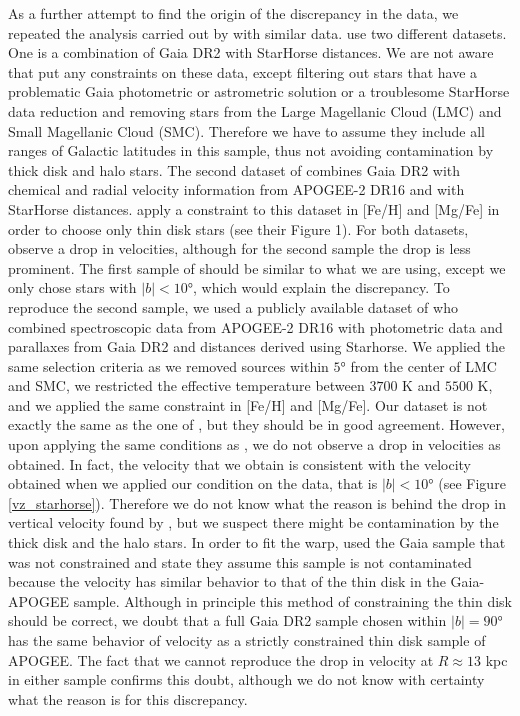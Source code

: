 \documentclass[twocolumn]{aastex63}
\begin{document}
As a further attempt to find the origin of the discrepancy in the data, we repeated the analysis carried out by  with similar data.  use two different datasets. One is a combination of Gaia DR2 with StarHorse distances. We are not aware that  put any constraints on these data, except filtering out stars that have a problematic Gaia photometric or astrometric solution or a troublesome StarHorse data reduction and removing stars from the Large Magellanic Cloud (LMC) and Small Magellanic Cloud (SMC). Therefore we have to assume they include all ranges of Galactic latitudes in this sample, thus not avoiding contamination by thick disk and halo stars. The second dataset of  combines Gaia DR2 with chemical and radial velocity information from APOGEE-2 DR16 and with StarHorse distances.  apply a constraint to this dataset in [Fe/H] and [Mg/Fe] in order to choose only thin disk stars (see their Figure 1). For both datasets,  observe a drop in velocities, although for the second sample the drop is less prominent. The first sample of  should be similar to what we are using, except we only chose stars with $\lvert b \rvert < \ang{10}$, which would explain the discrepancy. To reproduce the second sample, we used a publicly available dataset of \cite{queiroz_data} who combined spectroscopic data from APOGEE-2 DR16 with photometric data and parallaxes from Gaia DR2 and distances derived using Starhorse. We applied the same selection criteria as  \textemdash we removed sources within $\ang{5}$ from the center of LMC and SMC, we restricted the effective temperature between $3700$ K and $5500$ K, and we applied the same constraint in [Fe/H] and [Mg/Fe]. Our dataset is not exactly the same as the one of , but they should be in good agreement. However, upon applying the same conditions as , we do not observe a drop in velocities as  obtained. In fact, the velocity that we obtain is consistent with the velocity obtained when we applied our condition on the data, that is $\lvert b \rvert < \ang{10}$ (see Figure \ref{vz_starhorse}). 
Therefore we do not know what the reason is behind the drop in vertical velocity found by , but we suspect there might be contamination by the thick disk and the halo stars. In order to fit the warp,  used the Gaia sample that was not constrained and  state they assume this sample is not contaminated because the velocity has similar behavior to that of the thin disk in the Gaia-APOGEE sample. Although in principle this method of constraining the thin disk should be correct, we doubt that a full Gaia DR2 sample chosen within $\lvert b \rvert = \ang{90}$ has the same behavior of velocity as a strictly constrained thin disk sample of APOGEE. The fact that we cannot reproduce the drop in velocity at $R\approx13$ kpc in either sample confirms this doubt, although we do not know with certainty what the reason is for this discrepancy. 
\end{document}
